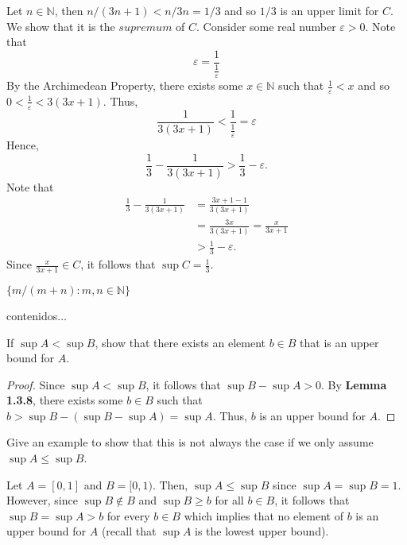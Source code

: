\documentclass[12pt]{article}
\newcommand{\N}{\mathbb{N}}
\newenvironment{problem}[2][Problem]{\begin{trivlist}
		\item[\hskip \labelsep {\bfseries #1}\hskip \labelsep {\bfseries #2.}]}{\end{trivlist}}
\newenvironment{solution}[2][Solution]{\begin{trivlist}
		\item[\hskip \labelsep {\bfseries #1}\hskip \labelsep {\bfseries #2.}]}{\end{trivlist}}
\begin{document}
\begin{problem}{1.3.8}
\begin{enumerate}[label=(\alph*)]
\begin{solution}{(c)}
			Let $n\in \N$, then $n/(3n+1) < n/3n = 1/3$ and so $1/3$ is an upper limit for $C$. We show that it is the $supremum$ of $C$. Consider some real number $\varepsilon > 0$. Note that 
			\begin{equation*}
				\varepsilon = \frac{1}{\frac{1}{\varepsilon}}
			\end{equation*}
			By the Archimedean Property, there exists some $x\in \N$ such that $\frac{1}{\varepsilon} < x$ and so $0<\frac{1}{\varepsilon} < 3(3x+1)$. Thus,
		\begin{equation*}
		 \frac{1}{3(3x+1)} < \frac{1}{\frac{1}{\varepsilon}}=\varepsilon
		\end{equation*}
		Hence, 
		\begin{equation*}
			\frac{1}{3}-\frac{1}{3(3x+1)} > \frac{1}{3}-\varepsilon.
		\end{equation*}
	Note that
		\begin{align*}
			\frac{1}{3}-\frac{1}{3(3x+1)} &= \frac{3x+1-1}{3(3x+1)}\\
			&= \frac{3x}{3(3x+1)} = \frac{x}{3x+1}\\
			&> \frac{1}{3}-\varepsilon.
		\end{align*}
	Since $\frac{x}{3x+1} \in C$, it follows that $\sup C = \frac{1}{3}$. 
				\end{solution} 
		\item $\{m/(m+n):m,n\in \N\}$
		\begin{solution}{d}
			contenidos... 
		\end{solution}
			\end{enumerate}
		\end{problem}
	
		\begin{problem}{1.3.9}
			\begin{enumerate}[label=(\alph*)]
				\item If $\sup A < \sup B$, show that there exists an element $b\in B$ that is an upper bound for $A$.
				\begin{proof}
				 Since $\sup A < \sup B$, it follows that $\sup B-\sup A > 0$. By \textbf{Lemma 1.3.8}, there exists some $b\in B$ such that $b>\sup B - (\sup B- \sup A) = \sup A$. Thus, $b$ is an upper bound for $A$.
				\end{proof}
				\item Give an example to show that this is not always the case if we only assume $\sup A \leq \sup B$.
				\begin{solution}{b}
					Let $A=[0,1]$ and $B=[0,1)$. Then, $\sup A \leq \sup B$ since $\sup A = \sup B = 1$.  However, since $\sup B\not\in B$ and $\sup B \geq b$ for all $b\in B$, it follows that $\sup B = \sup A > b$ for every $b\in B$ which implies that no element of $b$ is an upper bound for $A$ (recall that $\sup A$ is the lowest upper bound). 
				\end{solution}
			\end{enumerate}
		\end{problem}
\end{document}
